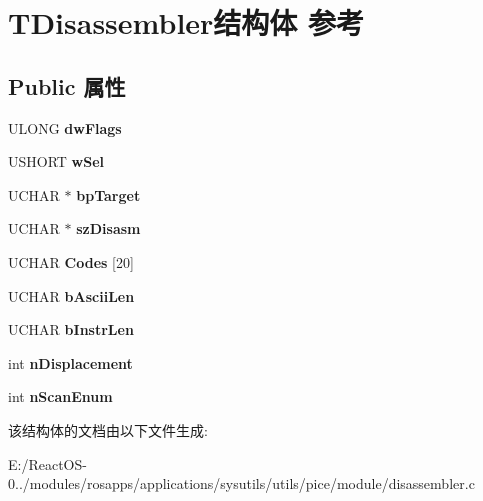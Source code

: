 \hypertarget{struct_t_disassembler}{}\section{T\+Disassembler结构体 参考}
\label{struct_t_disassembler}
\subsection*{Public 属性}
\begin{DoxyCompactItemize}
\item 
\mbox{\label{struct_t_disassembler_a831a99881ceb5b6bcad5a3c5a2e30e74}} 
U\+L\+O\+NG {\bfseries dw\+Flags}
\item 
\mbox{\label{struct_t_disassembler_a6a0ff10dc151f3674e71088ea74afb77}} 
U\+S\+H\+O\+RT {\bfseries w\+Sel}
\item 
\mbox{\label{struct_t_disassembler_a09166380c29937c269c22edfeff77551}} 
U\+C\+H\+AR $\ast$ {\bfseries bp\+Target}
\item 
\mbox{\label{struct_t_disassembler_a38e4113bc2889555800361534f5df799}} 
U\+C\+H\+AR $\ast$ {\bfseries sz\+Disasm}
\item 
\mbox{\label{struct_t_disassembler_a319b9f22834b8ecd1d982c647f7bcd4f}} 
U\+C\+H\+AR {\bfseries Codes} \mbox{[}20\mbox{]}
\item 
\mbox{\label{struct_t_disassembler_a764305a91102658a29208c5aa95ba159}} 
U\+C\+H\+AR {\bfseries b\+Ascii\+Len}
\item 
\mbox{\label{struct_t_disassembler_ac3d47a8ea14e3ea5d167b06fff857b46}} 
U\+C\+H\+AR {\bfseries b\+Instr\+Len}
\item 
\mbox{\label{struct_t_disassembler_ac4701b55d1f4e7f38447a30ec456fc37}} 
int {\bfseries n\+Displacement}
\item 
\mbox{\label{struct_t_disassembler_a81f93b2eb52b55f839a04066614558ba}} 
int {\bfseries n\+Scan\+Enum}
\end{DoxyCompactItemize}


该结构体的文档由以下文件生成\+:\begin{DoxyCompactItemize}
\item 
E\+:/\+React\+O\+S-\/0../modules/rosapps/applications/sysutils/utils/pice/module/disassembler.\+c\end{DoxyCompactItemize}
